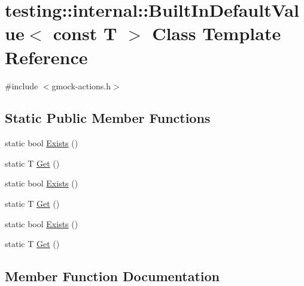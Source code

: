 \hypertarget{classtesting_1_1internal_1_1_built_in_default_value_3_01const_01_t_01_4}{}\section{testing\+::internal\+::Built\+In\+Default\+Value$<$ const T $>$ Class Template Reference}
\label{classtesting_1_1internal_1_1_built_in_default_value_3_01const_01_t_01_4}


{\ttfamily \#include $<$gmock-\/actions.\+h$>$}

\subsection*{Static Public Member Functions}
\begin{DoxyCompactItemize}
\item 
static bool \mbox{\hyperlink{classtesting_1_1internal_1_1_built_in_default_value_3_01const_01_t_01_4_a1814803ec5dcc660ee1f1092a96b79fa}{Exists}} ()
\item 
static T \mbox{\hyperlink{classtesting_1_1internal_1_1_built_in_default_value_3_01const_01_t_01_4_a5996754952ecbcc5da77a2cebd4722de}{Get}} ()
\item 
static bool \mbox{\hyperlink{classtesting_1_1internal_1_1_built_in_default_value_3_01const_01_t_01_4_a1814803ec5dcc660ee1f1092a96b79fa}{Exists}} ()
\item 
static T \mbox{\hyperlink{classtesting_1_1internal_1_1_built_in_default_value_3_01const_01_t_01_4_a5996754952ecbcc5da77a2cebd4722de}{Get}} ()
\item 
static bool \mbox{\hyperlink{classtesting_1_1internal_1_1_built_in_default_value_3_01const_01_t_01_4_a1814803ec5dcc660ee1f1092a96b79fa}{Exists}} ()
\item 
static T \mbox{\hyperlink{classtesting_1_1internal_1_1_built_in_default_value_3_01const_01_t_01_4_a5996754952ecbcc5da77a2cebd4722de}{Get}} ()
\end{DoxyCompactItemize}


\subsection{Member Function Documentation}
\mbox{\label{classtesting_1_1internal_1_1_built_in_default_value_3_01const_01_t_01_4_a1814803ec5dcc660ee1f1092a96b79fa}} 
